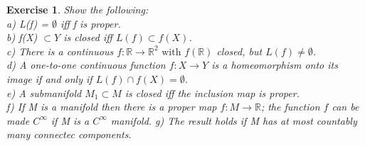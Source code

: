 \documentclass{article}
\newtheorem{exercise}{Exercise}
\begin{document}
\begin{exercise}
  Show the following: \\
  a) L(f) = $\emptyset$ iff f is proper. \\
  b) f(X) $\subset Y$ is closed iff $L(f) \subset f(X)$. \\
  c) There is a continuous $f: \mathbb{R} \to \mathbb{R}^{2} \text{ with } f(\mathbb{R})$ closed, but $L(f) \neq \emptyset$. \\
  d) A one-to-one continuous function $f: X \to Y$ is a homeomorphism onto its image if and only if $L(f) \cap f(X) = \emptyset$. \\
  e) A submanifold $M_{1} \subset M$ is closed iff the inclusion map is proper. \\
  f) If M is a manifold then there is a proper map $f: M \to \mathbb{R}$; the function $f$ can be made $C^{\infty}$ if M is a $C^{\infty}$ manifold.
  g) The result holds if M has at most countably many connectec components.
\end{exercise}
\end{document}
